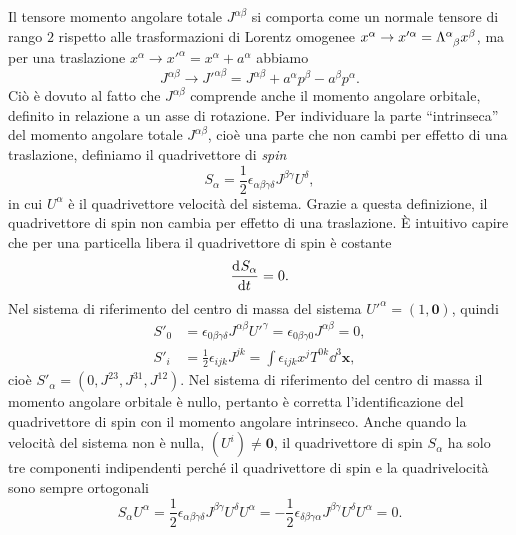 Il tensore momento angolare totale $J^{\alpha\beta}$ si comporta come un normale
tensore di rango $2$ rispetto alle trasformazioni di Lorentz omogenee
$x^{\alpha} \to x'^{\alpha} = \tensor{\Lambda}{^{\alpha}_{\beta}} x^{\beta}$, ma
per una traslazione $x^{\alpha} \to x'^{\alpha} = x^{\alpha} + a^{\alpha}$
abbiamo
\begin{equation}
  J^{\alpha\beta} \to J'^{\alpha\beta} = J^{\alpha\beta} + a^{\alpha}p^{\beta} -
  a^{\beta}p^{\alpha}.
\end{equation}
Ciò è dovuto al fatto che $J^{\alpha\beta}$ comprende anche il momento angolare
orbitale, definito in relazione a un asse di rotazione.  Per individuare la
parte ``intrinseca'' del momento angolare totale $J^{\alpha\beta}$, cioè una
parte che non cambi per effetto di una traslazione, definiamo il quadrivettore
di \emph{spin}
\begin{equation}
  S_{\alpha} = \frac{1}{2}\epsilon_{\alpha\beta\gamma\delta} J^{\beta\gamma} U^{\delta},
\end{equation}
in cui $U^{\alpha}$ è il quadrivettore velocità del sistema.  Grazie a questa
definizione, il quadrivettore di spin non cambia per effetto di una traslazione.
È intuitivo capire che per una particella libera il quadrivettore di spin è
costante
\begin{equation}
  \frac{{\mathop{}\!\mathrm{d}^{}}S_{\alpha}}{\mathop{}\!\mathrm{d} {t}^{}} = 0.
\end{equation}
Nel sistema di riferimento del centro di massa del sistema
$U'^{\alpha} = (1, \bm{0})$, quindi
\begin{subequations}
  \begin{align}
    S'_{0} &= \epsilon_{0\beta\gamma\delta} J^{\alpha\beta} U'^{\gamma} =
    \epsilon_{0\beta\gamma 0} J^{\alpha\beta} = 0, \\
    S'_{i} &= \frac{1}{2}\epsilon_{ijk} J^{jk} = \int \epsilon_{ijk} x^{j}T^{0k}
    \dd^{3} \bm{x},
  \end{align}
\end{subequations}
cioè $S'_{\alpha} = (0, J^{23}, J^{31}, J^{12})$.  Nel sistema di riferimento
del centro di massa il momento angolare orbitale è nullo, pertanto è corretta
l'identificazione del quadrivettore di spin con il momento angolare intrinseco.
Anche quando la velocità del sistema non è nulla, $(U^{i}) \neq \bm{0}$, il
quadrivettore di spin $S_{\alpha}$ ha solo tre componenti indipendenti perché
il quadrivettore di spin e la quadrivelocità sono sempre ortogonali
\begin{equation}
  S_{\alpha}U^{\alpha} = \frac{1}{2}
  \epsilon_{\alpha\beta\gamma\delta}J^{\beta\gamma}U^{\delta}U^{\alpha} =
  -\frac{1}{2}
  \epsilon_{\delta\beta\gamma\alpha}J^{\beta\gamma}U^{\delta}U^{\alpha} = 0.
\end{equation}


